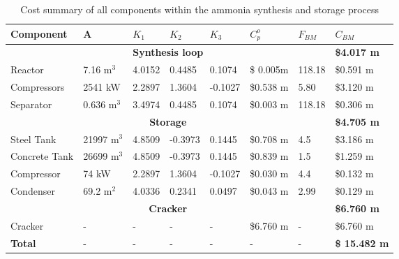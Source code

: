 \begin{table}[!htbp]
	\begin{center}
		
		\caption{Cost summary of all components within the ammonia synthesis and storage process\label{tab:Cost}}
		
		\begin{tabular}{|l|l|l|l|l|l|l|l|}
			\hline
			Component& A & $K_1$   &$K_2$   &$K_3$   & $C_p^o$  & $F_{BM}$ & $C_{BM}$ \\ \hline
			\multicolumn{7}{|c|}{\textbf{Synthesis loop} }& \textbf{\$4.017 m} \\
			\hline
			Reactor                           & 7.16 m$^3$                & 4.0152 & 0.4485     & 0.1074 & \$ 0.005m & 118.18&   \$0.591 m                 \\ \hline 
			Compressors                             & 2541 kW        & 2.2897 & 1.3604         & -0.1027 & \$0.538 m & 5.80 &  \$3.120 m                  \\ \hline 
			Separator                              & 0.636 m$^3$                & 3.4974 & 0.4485         & 0.1074 & \$0.003 m & 118.18 &  \$0.306 m                  \\ \hline 
			\multicolumn{7}{|c|}{\textbf{Storage} } & \textbf{\$4.705 m} \\
			\hline
			Steel Tank                          & 21997 	m$^3$                & 4.8509 & -0.3973         & 0.1445 & \$0.708 m &4.5 &  \$3.186 m              \\ \hline 
			Concrete Tank                          & 26699 m$^3$                & 4.8509 & -0.3973         & 0.1445 & \$0.839 m &1.5 &  \$1.259 m              \\ \hline 
			Compressor                          & 74 kW                & 2.2897 & 1.3604        & -0.1027 & \$0.030 m &4.4 &  \$0.132 m              \\ \hline 
			Condenser                       & 69.2 m$^2$                & 4.0336 & 0.2341         & 0.0497 & \$0.043 m &2.99 &  \$0.129 m              \\ \hline 	
			\multicolumn{7}{|c|}{\textbf{Cracker} } & \textbf{\$6.760 m} \\
			\hline
			Cracker                             & -                & - & -        & - & \$6.760 m & -&     \$6.760 m               \\ \hline 
			\textbf{Total}& - & - &  -   & - &-  & - &  \textbf{\$ 15.482 m} \\ \hline
			
		\end{tabular}
	
	\end{center}
\end{table}
 
